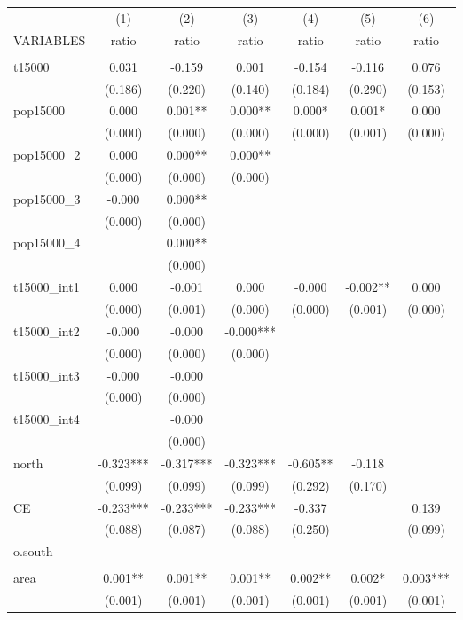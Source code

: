 \documentclass[]{article}
\begin{document}
\begin{tabular}{lcccccc} \hline
 & (1) & (2) & (3) & (4) & (5) & (6) \\
VARIABLES & ratio & ratio & ratio & ratio & ratio & ratio \\ \hline
 &  &  &  &  &  &  \\
t15000 & 0.031 & -0.159 & 0.001 & -0.154 & -0.116 & 0.076 \\
 & (0.186) & (0.220) & (0.140) & (0.184) & (0.290) & (0.153) \\
pop15000 & 0.000 & 0.001** & 0.000** & 0.000* & 0.001* & 0.000 \\
 & (0.000) & (0.000) & (0.000) & (0.000) & (0.001) & (0.000) \\
pop15000\_2 & 0.000 & 0.000** & 0.000** &  &  &  \\
 & (0.000) & (0.000) & (0.000) &  &  &  \\
pop15000\_3 & -0.000 & 0.000** &  &  &  &  \\
 & (0.000) & (0.000) &  &  &  &  \\
pop15000\_4 &  & 0.000** &  &  &  &  \\
 &  & (0.000) &  &  &  &  \\
t15000\_int1 & 0.000 & -0.001 & 0.000 & -0.000 & -0.002** & 0.000 \\
 & (0.000) & (0.001) & (0.000) & (0.000) & (0.001) & (0.000) \\
t15000\_int2 & -0.000 & -0.000 & -0.000*** &  &  &  \\
 & (0.000) & (0.000) & (0.000) &  &  &  \\
t15000\_int3 & -0.000 & -0.000 &  &  &  &  \\
 & (0.000) & (0.000) &  &  &  &  \\
t15000\_int4 &  & -0.000 &  &  &  &  \\
 &  & (0.000) &  &  &  &  \\
north & -0.323*** & -0.317*** & -0.323*** & -0.605** & -0.118 &  \\
 & (0.099) & (0.099) & (0.099) & (0.292) & (0.170) &  \\
CE & -0.233*** & -0.233*** & -0.233*** & -0.337 &  & 0.139 \\
 & (0.088) & (0.087) & (0.088) & (0.250) &  & (0.099) \\
o.south & - & - & - & - &  &  \\
 &  &  &  &  &  &  \\
area & 0.001** & 0.001** & 0.001** & 0.002** & 0.002* & 0.003*** \\
 & (0.001) & (0.001) & (0.001) & (0.001) & (0.001) & (0.001) \\

\end{tabular}
\end{document}
